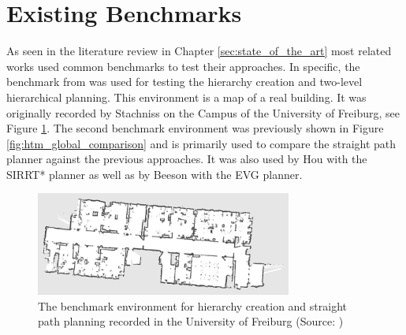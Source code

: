 \section{Existing Benchmarks}
\label{sec:benchmarks}
 As seen in the literature review in Chapter \ref{sec:state_of_the_art} most related works used common benchmarks to test their approaches. In specific, the benchmark from \cite{ryu_hierarchical_2020} was used for testing the hierarchy creation and two-level hierarchical planning. This environment is a map of a real building. It was originally recorded by Stachniss \cite{cyrill_stachniss_robotics_2015} on the Campus of the University of Freiburg, see Figure \ref{fig:freiburg_benchmark}. The second benchmark environment was previously shown in Figure \ref{fig:htm_global_comparison} and is primarily used to compare the straight path planner against the previous approaches. It was also used by Hou \cite{hou_straight_2021} with the SIRRT* planner as well as by Beeson \cite{beeson_towards_2005} with the EVG planner.

\begin{figure}[h]
    \centering
    \includegraphics[width=0.75\textwidth]{figures/30_methods/freiburg_benchmark.png}
    \caption[The benchmark environment for hierarchy creation and straight path planning]{The benchmark environment for hierarchy creation and straight path planning recorded in the University of Freiburg (Source: \cite{cyrill_stachniss_robotics_2015})}
    \label{fig:freiburg_benchmark}
\end{figure}

